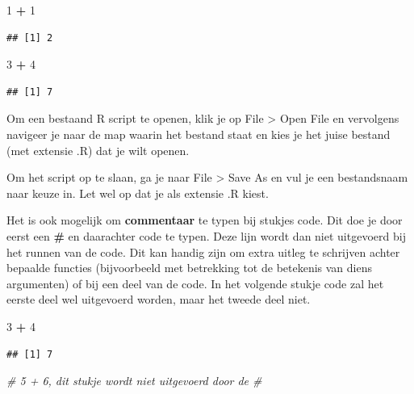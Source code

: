 \documentclass[
]{book}
\newenvironment{Shaded}{\begin{snugshade}}{\end{snugshade}}
\newcommand{\CommentTok}[1]{\textcolor[rgb]{0.56,0.35,0.01}{\textit{#1}}}
\newcommand{\DecValTok}[1]{\textcolor[rgb]{0.00,0.00,0.81}{#1}}
\newcommand{\SpecialCharTok}[1]{\textcolor[rgb]{0.81,0.36,0.00}{\textbf{#1}}}
\begin{document}
\begin{Shaded}
\begin{Highlighting}[]
\DecValTok{1} \SpecialCharTok{+} \DecValTok{1}
\end{Highlighting}
\end{Shaded}

\begin{verbatim}
## [1] 2
\end{verbatim}

\begin{Shaded}
\begin{Highlighting}[]
\DecValTok{3} \SpecialCharTok{+} \DecValTok{4}
\end{Highlighting}
\end{Shaded}

\begin{verbatim}
## [1] 7
\end{verbatim}

Om een bestaand R script te openen, klik je op File \textgreater{} Open File en vervolgens navigeer je naar de map waarin het bestand staat en kies je het juise bestand (met extensie .R) dat je wilt openen.

Om het script op te slaan, ga je naar File \textgreater{} Save As en vul je een bestandsnaam naar keuze in. Let wel op dat je als extensie .R kiest.

Het is ook mogelijk om \textbf{commentaar} te typen bij stukjes code. Dit doe je door eerst een \textbf{\#} en daarachter code te typen. Deze lijn wordt dan niet uitgevoerd bij het runnen van de code. Dit kan handig zijn om extra uitleg te schrijven achter bepaalde functies (bijvoorbeeld met betrekking tot de betekenis van diens argumenten) of bij een deel van de code. In het volgende stukje code zal het eerste deel wel uitgevoerd worden, maar het tweede deel niet.

\begin{Shaded}
\begin{Highlighting}[]
\DecValTok{3} \SpecialCharTok{+} \DecValTok{4}
\end{Highlighting}
\end{Shaded}

\begin{verbatim}
## [1] 7
\end{verbatim}

\begin{Shaded}
\begin{Highlighting}[]
\CommentTok{\# 5 + 6, dit stukje wordt niet uitgevoerd door de \textquotesingle{}\#\textquotesingle{}}
\end{Highlighting}
\end{Shaded}
\end{document}
